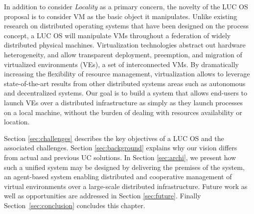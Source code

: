 In addition to consider \emph{Locality} as a primary concern, the novelty of the LUC OS
proposal is to consider VM as the basic object it manipulates.  Unlike existing
research on distributed operating systems that have been designed on the process concept, a LUC OS will manipulate VMs throughout a federation of widely distributed
physical machines. Virtualization technologies abstract out hardware heterogeneity, and allow
transparent deployment, preemption, and migration of virtualized
environments (VEs), \ie a set of interconnected VMs.
By dramatically increasing the flexibility of resource management, virtualization 
allows to leverage state-of-the-art results from other distributed
systems areas such as autonomous and decentralized systems.  
Our goal is to build a system that allows end-users to launch VEs over a
distributed infrastructure as simply as they launch processes on a
local machine, \ie  without the burden of dealing with resources
availability or location.

Section \ref{sec:challenges} describes the key objectives of a LUC OS and the associated challenges. 
Section \ref{sec:background} explains why our vision differs from actual and previous UC solutions. In
Section \ref{sec:archi}, we present how such a unified system may be designed
by delivering the premises of the \discovery system, an agent-based system
enabling distributed and cooperative management of virtual environments over a
large-scale distributed infrastructure.
Future work as well as opportunities  are addressed in Section \ref{sec:future}. Finally Section~\ref{sec:conclusion} concludes this chapter. 
